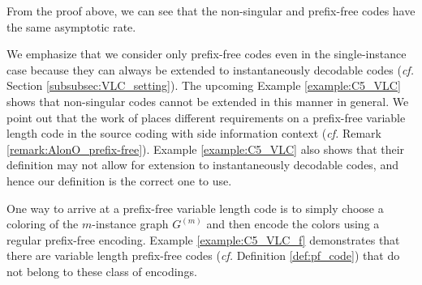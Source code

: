 \documentclass[journal, onecolumn, draftcls]{IEEEtran}
\theoremstyle{definition}
\newcommand{\bfx}{\mathbf{x}}
\newcommand{\meng}[1]{\marginpar{+}{\bf Ruoyu's remark}: {\em #1}}
\newcommand{\aditya}[1]{\marginpar{+}{\bf Aditya's remark}: {\em #1}}
\begin{document}
\noindent From the proof above, we can see that the non-singular and prefix-free codes have the same asymptotic rate.   %


We emphasize that we consider only prefix-free codes even in the single-instance case because they can always be extended to instantaneously decodable codes ({\it cf.} Section \ref{subsubsec:VLC_setting}). The upcoming Example \ref{example:C5_VLC} shows that non-singular codes cannot be extended in this manner in general. We point out that the work of \cite{AlonO_96} places different requirements on a prefix-free variable length code in the source coding with side information context ({\it cf.} Remark \ref{remark:AlonO_prefix-free}). Example \ref{example:C5_VLC} also shows that their definition may not allow for extension to instantaneously decodable codes, and hence our definition is the correct one to use. 

One way to arrive at a prefix-free variable length code is to simply choose a coloring of the $m$-instance graph $G^{(m)}$ and then encode the colors using a regular prefix-free encoding. Example \ref{example:C5_VLC_f} demonstrates that there are variable length prefix-free codes ({\it cf.} Definition \ref{def:pf_code}) that do not belong to these class of encodings. %


\end{document}
